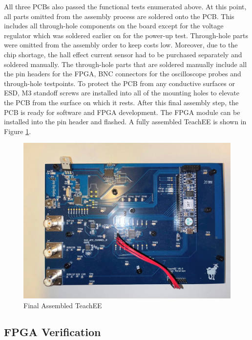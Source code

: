 \documentclass[letterpaper,11pt]{article}
\begin{document}
All three PCBs also passed the functional tests enumerated above. At this point,
all parts omitted from the assembly process are soldered onto the PCB. This
includes all through-hole components on the board except for the voltage
regulator which was soldered earlier on for the power-up test. Through-hole
parts were omitted from the assembly order to keep costs low. Moreover, due to
the chip shortage, the hall effect current sensor had to be purchased separately
and soldered manually. The through-hole parts that are soldered manually include
all the pin headers for the FPGA, BNC connectors for the oscilloscope probes and
through-hole testpoints. To protect the PCB from any conductive surfaces or ESD,
M3 standoff screws are installed into all of the mounting holes to elevate the
PCB from the surface on which it rests. After this final assembly step, the PCB
is ready for software and FPGA development. The FPGA module can be installed
into the pin header and flashed. A fully assembled TeachEE is shown in Figure
\ref{fig:pcb-final}.

\begin{figure}[H]
  \centering
  \includegraphics[width=\textwidth]{figures/pcb-final.jpg}
  \caption{Final Assembled TeachEE}
  \label{fig:pcb-final}
\end{figure}

\subsection{FPGA Verification} %

\end{document}
